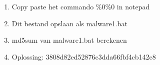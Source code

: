 \begin{enumerate}
  \item Copy paste het commando \%0\textbar\%0 in notepad
  \item Dit bestand opslaan als malware1.bat
  \item md5sum van malware1.bat berekenen
  \item Oplossing: 3808d82ed52876c3dda66fbf4cb142c8
\end{enumerate}